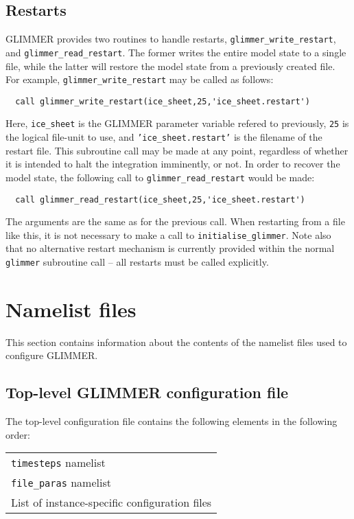 \documentclass[11pt]{article}
\begin{document}
\subsection{Restarts}
%
GLIMMER provides two routines to handle restarts,
\texttt{glimmer\_write\_restart}, and \texttt{glimmer\_read\_restart}. The
former writes the entire model state to a single file, while the latter will
restore the model state from a previously created
file. For example, \texttt{glimmer\_write\_restart} may be called as follows:
%
\begin{verbatim}
  call glimmer_write_restart(ice_sheet,25,'ice_sheet.restart')
\end{verbatim}
%
Here, \texttt{ice\_sheet} is the GLIMMER parameter variable refered to
previously, \texttt{25} is the logical file-unit to use, and
\texttt{'ice\_sheet.restart'} is the filename of the restart file. This
subroutine call may be made at any point, regardless of whether it is intended
to halt the integration imminently, or not. In order to recover the model
state, the following call to \texttt{glimmer\_read\_restart} would be made:
%
\begin{verbatim}
  call glimmer_read_restart(ice_sheet,25,'ice_sheet.restart')
\end{verbatim}
%
The arguments are the same as for the previous call. When restarting from a
file like this, it is not necessary to make a call to
\texttt{initialise\_glimmer}. Note also that no alternative restart mechanism
is currently provided within the normal \texttt{glimmer} subroutine call -- all restarts
must be called explicitly.
%
\section{Namelist files}
%
This section contains information about the contents of the namelist files
used to configure GLIMMER.
%
\subsection{Top-level GLIMMER configuration file}
%
The top-level configuration file contains the following elements in the
following order:
\begin{center}
\begin{tabular}{l}
\texttt{timesteps} namelist \\
\texttt{file\_paras} namelist \\
List of instance-specific configuration files \\
\end{tabular}
\end{center}
%
\end{document}
